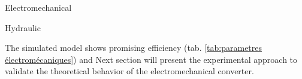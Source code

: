 \documentclass[3p,twocolumn,preprint]{elsarticle}
\def \hfillx {\hspace*{ -\linewidth} \hfill} %
\begin{document}
\begin{table}
\begin{subtable}[b]{.42\linewidth}
	\centering
	\caption{Electromechanical}
	\label{tab:parametres électromécaniques}			
\end{subtable}
\hfillx
\begin{subtable}[b]{.55\linewidth}
	\centering
	\caption{Hydraulic}
	\label{tab:parametres_hydrauliques}		
\end{subtable}
\caption{Simulated model theoretical parameters}
\end{table}

The simulated model shows promising efficiency (tab. \ref{tab:parametres électromécaniques}) and  Next section will present the experimental approach to validate the theoretical behavior of the electromechanical converter.
\end{document}
